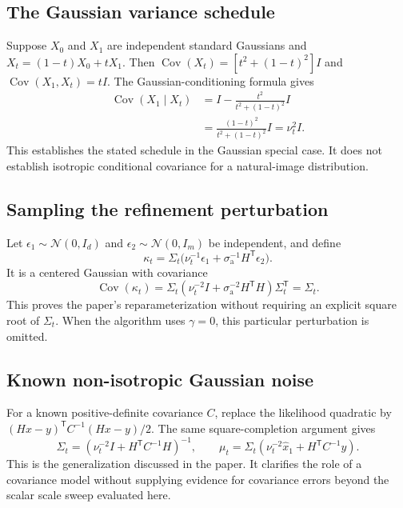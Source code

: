 \documentclass[10pt,letterpaper]{article}
\newcommand{\N}{\mathcal{N}}
\newcommand{\sa}{\sigma_{\mathrm a}}
\newcommand{\xhat}{\widehat{x}_1}
\begin{document}
\subsection{The Gaussian variance schedule}
Suppose $X_0$ and $X_1$ are independent standard Gaussians and $X_t=(1-t)X_0+tX_1$. Then $\operatorname{Cov}(X_t)=[t^2+(1-t)^2]I$ and $\operatorname{Cov}(X_1,X_t)=tI$. The Gaussian-conditioning formula gives
\begin{align}
 \operatorname{Cov}(X_1\mid X_t)
 &=I-\frac{t^2}{t^2+(1-t)^2}I\\
 &=\frac{(1-t)^2}{t^2+(1-t)^2}I=\nu_t^2I.
\end{align}
This establishes the stated schedule in the Gaussian special case. It does not establish isotropic conditional covariance for a natural-image distribution.

\subsection{Sampling the refinement perturbation}
Let $\epsilon_1\sim\N(0,I_d)$ and $\epsilon_2\sim\N(0,I_m)$ be independent, and define
\begin{equation}
 \kappa_t=\Sigma_t\bigl(\nu_t^{-1}\epsilon_1+\sa^{-1}H^\mathsf{T}\epsilon_2\bigr).
\end{equation}
It is a centered Gaussian with covariance
\begin{equation}
 \operatorname{Cov}(\kappa_t)=\Sigma_t
 (\nu_t^{-2}I+\sa^{-2}H^\mathsf{T}H)\Sigma_t^\mathsf{T}=\Sigma_t.
\end{equation}
This proves the paper's reparameterization without requiring an explicit square root of $\Sigma_t$. When the algorithm uses $\gamma=0$, this particular perturbation is omitted.

\subsection{Known non-isotropic Gaussian noise}
For a known positive-definite covariance $C$, replace the likelihood quadratic by $(Hx-y)^\mathsf{T}C^{-1}(Hx-y)/2$. The same square-completion argument gives
\begin{equation}
 \Sigma_t=(\nu_t^{-2}I+H^\mathsf{T}C^{-1}H)^{-1},\qquad
 \mu_t=\Sigma_t(\nu_t^{-2}\xhat+H^\mathsf{T}C^{-1}y).
\end{equation}
This is the generalization discussed in the paper. It clarifies the role of a covariance model without supplying evidence for covariance errors beyond the scalar scale sweep evaluated here.
\end{document}

